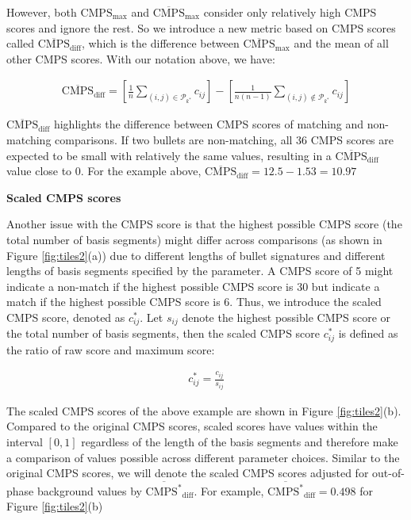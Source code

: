 However, both \(\mathrm{CMPS_{max}}\) and \(\mathrm{\overline{CMPS}_{max}}\) consider only relatively high CMPS scores and ignore the rest.
So we introduce a new metric based on CMPS scores called \(\mathrm{\overline{CMPS}_{diff}}\), which is the difference between \(\mathrm{\overline{CMPS}_{max}}\) and the mean of all other CMPS scores.
With our notation above, we have:

\begin{align}
\mathrm{\overline{CMPS}_{diff}} = \left[  \frac{1}{n} \sum_{(i,j) \in \mathcal{P}_{k^*}} c_{ij}\right] - \left[  \frac{1}{n\left(n-1\right)} \sum_{(i,j) \notin \mathcal{P}_{k^*}} c_{ij}\right]
\end{align}

\(\mathrm{\overline{CMPS}_{diff}}\) highlights the difference between CMPS scores of matching and non-matching comparisons.
If two bullets are non-matching, all 36 CMPS scores are expected to be small with relatively the same values, resulting in a \(\mathrm{\overline{CMPS}_{diff}}\) value close to 0.
For the example above, \(\mathrm{\overline{CMPS}_{diff}} = 12.5 - 1.53 = 10.97\)

\textbf{Scaled CMPS scores}

Another issue with the CMPS score is that the highest possible CMPS score (the total number of basis segments) might differ across comparisons (as shown in Figure \ref{fig:tiles2}(a)) due to different lengths of bullet signatures and different lengths of basis segments specified by the parameter.
A CMPS score of 5 might indicate a non-match if the highest possible CMPS score is 30 but indicate a match if the highest possible CMPS score is 6.
Thus, we introduce the scaled CMPS score, denoted as \(c^*_{ij}\).
Let \(s_{ij}\) denote the highest possible CMPS score or the total number of basis segments, then the scaled CMPS score \(c^*_{ij}\) is defined as the ratio of raw score and maximum score:

\begin{align}
c^*_{ij} = \frac{c_{ij}}{s_{ij}}
\end{align}

The scaled CMPS scores of the above example are shown in Figure \ref{fig:tiles2}(b).
Compared to the original CMPS scores, scaled scores have values within the interval \([0, 1]\) regardless of the length of the basis segments and therefore make a comparison of values possible across different parameter choices.
Similar to the original CMPS scores, we will denote the scaled CMPS scores adjusted for out-of-phase background values by \(\mathrm{\overline{CMPS^*}_{diff}}\).
For example, \(\mathrm{\overline{CMPS^*}_{diff}} = 0.498\) for Figure \ref{fig:tiles2}(b)

